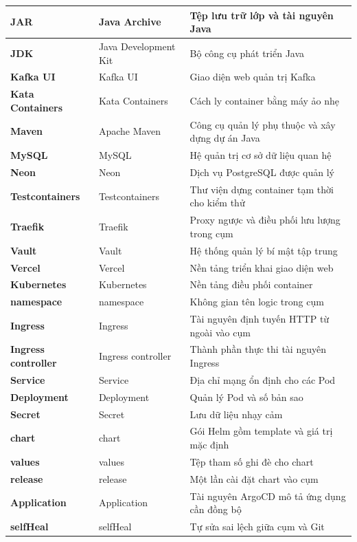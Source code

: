 \documentclass[../BTL.tex]{subfiles}
\begin{document}
\begin{longtable}{|p{3.2cm}|p{3.5cm}|p{7.1cm}|}
	\textbf{JAR} & Java Archive & Tệp lưu trữ lớp và tài nguyên Java\\ \hline
	\textbf{JDK} & Java Development Kit & Bộ công cụ phát triển Java\\ \hline
	\textbf{Kafka UI} & Kafka UI & Giao diện web quản trị Kafka\\ \hline
	\textbf{Kata Containers} & Kata Containers & Cách ly container bằng máy ảo nhẹ\\ \hline
	\textbf{Maven} & Apache Maven & Công cụ quản lý phụ thuộc và xây dựng dự án Java\\ \hline
	\textbf{MySQL} & MySQL & Hệ quản trị cơ sở dữ liệu quan hệ\\ \hline
	\textbf{Neon} & Neon & Dịch vụ PostgreSQL được quản lý\\ \hline
	\textbf{Testcontainers} & Testcontainers & Thư viện dựng container tạm thời cho kiểm thử\\ \hline
	\textbf{Traefik} & Traefik & Proxy ngược và điều phối lưu lượng trong cụm\\ \hline
	\textbf{Vault} & Vault & Hệ thống quản lý bí mật tập trung\\ \hline
	\textbf{Vercel} & Vercel & Nền tảng triển khai giao diện web\\ \hline
	\textbf{Kubernetes} & Kubernetes & Nền tảng điều phối container\\ \hline
	\textbf{namespace} & namespace & Không gian tên logic trong cụm\\ \hline
	\textbf{Ingress} & Ingress & Tài nguyên định tuyến HTTP từ ngoài vào cụm\\ \hline
	\textbf{Ingress controller} & Ingress controller & Thành phần thực thi tài nguyên Ingress\\ \hline
	\textbf{Service} & Service & Địa chỉ mạng ổn định cho các Pod\\ \hline
	\textbf{Deployment} & Deployment & Quản lý Pod và số bản sao\\ \hline
	\textbf{Secret} & Secret & Lưu dữ liệu nhạy cảm\\ \hline
	\textbf{chart} & chart & Gói Helm gồm template và giá trị mặc định\\ \hline
	\textbf{values} & values & Tệp tham số ghi đè cho chart\\ \hline
	\textbf{release} & release & Một lần cài đặt chart vào cụm\\ \hline
	\textbf{Application} & Application & Tài nguyên ArgoCD mô tả ứng dụng cần đồng bộ\\ \hline
	\textbf{selfHeal} & selfHeal & Tự sửa sai lệch giữa cụm và Git\\ \hline

\end{longtable}
\end{document}
